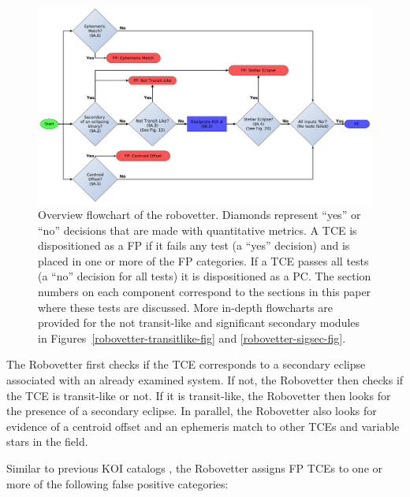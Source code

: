 \begin{figure}[ht]
\centering
\includegraphics[width=0.9\linewidth]{RoboVetter-Diagram-V4-Overview.pdf}
\caption{Overview flowchart of the robovetter. Diamonds represent ``yes'' or ``no'' decisions that are made with quantitative metrics. A TCE is dispositioned as a FP if it fails any test (a ``yes'' decision) and is placed in one or more of the FP categories. If a TCE passes all tests (a ``no'' decision for all tests) it is dispositioned as a PC. The section numbers on each component correspond to the sections in this paper where these tests are discussed. More in-depth flowcharts are provided for the not transit-like and significant secondary modules in Figures~\ref{robovetter-transitlike-fig} and \ref{robovetter-sigsec-fig}.}
\label{robovetter-overview-fig}
\end{figure}


The Robovetter first checks if the TCE corresponds to a secondary eclipse associated with an already examined system. If not, the Robovetter then checks if the TCE is transit-like or not. If it is transit-like, the Robovetter then looks for the presence of a secondary eclipse. In parallel, the Robovetter also looks for evidence of a centroid offset and an ephemeris match to other TCEs and variable stars in the \kepler{} field. 

\label{s:majorflags}
Similar to previous KOI catalogs \citep{Rowe2015cat, Mullally2015cat, Coughlin2016}, the Robovetter assigns FP TCEs to one or more of the following false positive categories:


